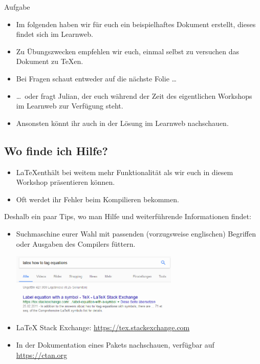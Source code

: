 \documentclass[german]{f1rstlady/templates/presentation}
\begin{document}
\begin{frame}{Aufgabe}
\begin{itemize}
    \item Im folgenden haben wir für euch ein beispielhaftes Dokument erstellt, dieses findet sich
        im Learnweb.
    \item Zu Übungszwecken empfehlen wir euch, einmal selbst zu versuchen das Dokument zu TeXen.
    \item Bei Fragen schaut entweder auf die nächste Folie \dots
    \item \dots\ oder fragt Julian, der euch während der Zeit des eigentlichen Workshops im Learnweb
        zur Verfügung steht.
    \item Ansonsten könnt ihr auch in der Lösung im Learnweb nachschauen.
\end{itemize}
\end{frame}

\subsection{Wo finde ich Hilfe?}

\begin{frame}{\subsecname}
\begin{itemize}
    \item \LaTeX enthält bei weitem mehr Funktionalität als wir euch in diesem Workshop präsentieren
        können.
    \item Oft werdet ihr Fehler beim Kompilieren bekommen.
\end{itemize}
Deshalb ein paar Tips, wo man Hilfe und weiterführende Informationen findet:
\begin{itemize}
	\item Suchmaschine eurer Wahl mit passenden (vorzugsweise englischen) Begriffen oder Ausgaben des Compilers füttern.
	\begin{center}
		\includegraphics[keepaspectratio,width=8cm]{images/google.png}
	\end{center}
	\item LaTeX Stack Exchange: \url{https://tex.stackexchange.com}
    \item In der Dokumentation eines Pakets nachschauen, verfügbar auf \url{https://ctan.org}
\end{itemize}
\end{frame}
\end{document}
